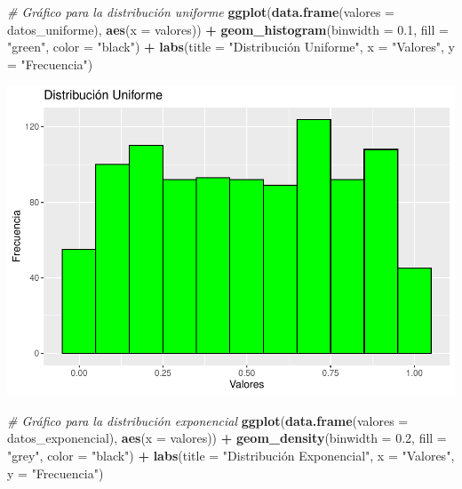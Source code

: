 \documentclass[
]{article}
\newenvironment{Shaded}{\begin{snugshade}}{\end{snugshade}}
\newcommand{\AttributeTok}[1]{\textcolor[rgb]{0.13,0.29,0.53}{#1}}
\newcommand{\CommentTok}[1]{\textcolor[rgb]{0.56,0.35,0.01}{\textit{#1}}}
\newcommand{\FloatTok}[1]{\textcolor[rgb]{0.00,0.00,0.81}{#1}}
\newcommand{\FunctionTok}[1]{\textcolor[rgb]{0.13,0.29,0.53}{\textbf{#1}}}
\newcommand{\NormalTok}[1]{#1}
\newcommand{\SpecialCharTok}[1]{\textcolor[rgb]{0.81,0.36,0.00}{\textbf{#1}}}
\newcommand{\StringTok}[1]{\textcolor[rgb]{0.31,0.60,0.02}{#1}}
\begin{document}
\begin{Shaded}
\begin{Highlighting}[]
\CommentTok{\# Gráfico para la distribución uniforme}
\FunctionTok{ggplot}\NormalTok{(}\FunctionTok{data.frame}\NormalTok{(}\AttributeTok{valores =}\NormalTok{ datos\_uniforme), }\FunctionTok{aes}\NormalTok{(}\AttributeTok{x =}\NormalTok{ valores)) }\SpecialCharTok{+}
  \FunctionTok{geom\_histogram}\NormalTok{(}\AttributeTok{binwidth =} \FloatTok{0.1}\NormalTok{, }\AttributeTok{fill =} \StringTok{"green"}\NormalTok{, }\AttributeTok{color =} \StringTok{"black"}\NormalTok{) }\SpecialCharTok{+}
  \FunctionTok{labs}\NormalTok{(}\AttributeTok{title =} \StringTok{"Distribución Uniforme"}\NormalTok{, }\AttributeTok{x =} \StringTok{"Valores"}\NormalTok{, }\AttributeTok{y =} \StringTok{"Frecuencia"}\NormalTok{)}
\end{Highlighting}
\end{Shaded}

\includegraphics{clase02_files/figure-latex/unnamed-chunk-1-2.pdf}

\begin{Shaded}
\begin{Highlighting}[]
\CommentTok{\# Gráfico para la distribución exponencial}
\FunctionTok{ggplot}\NormalTok{(}\FunctionTok{data.frame}\NormalTok{(}\AttributeTok{valores =}\NormalTok{ datos\_exponencial), }\FunctionTok{aes}\NormalTok{(}\AttributeTok{x =}\NormalTok{ valores)) }\SpecialCharTok{+}
  \FunctionTok{geom\_density}\NormalTok{(}\AttributeTok{binwidth =} \FloatTok{0.2}\NormalTok{, }\AttributeTok{fill =} \StringTok{"grey"}\NormalTok{, }\AttributeTok{color =} \StringTok{"black"}\NormalTok{) }\SpecialCharTok{+}
  \FunctionTok{labs}\NormalTok{(}\AttributeTok{title =} \StringTok{"Distribución Exponencial"}\NormalTok{, }\AttributeTok{x =} \StringTok{"Valores"}\NormalTok{, }\AttributeTok{y =} \StringTok{"Frecuencia"}\NormalTok{)}
\end{Highlighting}
\end{Shaded}
\end{document}

